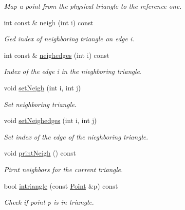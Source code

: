 \begin{DoxyCompactItemize}
\begin{DoxyCompactList}\small\item\em Map a point from the physical triangle to the reference one. \end{DoxyCompactList}\item 
int const \& \hyperlink{classTspeed_1_1Geo_1_1Triangle_a9258f1265a916d2ed4ccf4c0d0ddcbb7}{neigh} (int i) const 
\begin{DoxyCompactList}\small\item\em Ged index of neighboring triangle on edge i. \end{DoxyCompactList}\item 
int const \& \hyperlink{classTspeed_1_1Geo_1_1Triangle_a223bb2cb8fc96ea689daa5e7312aa7ca}{neighedges} (int i) const 
\begin{DoxyCompactList}\small\item\em Index of the edge i in the nieghboring triangle. \end{DoxyCompactList}\item 
void \hyperlink{classTspeed_1_1Geo_1_1Triangle_a1d71aed7672a87aed76934626d671ba7}{set\-Neigh} (int i, int j)
\begin{DoxyCompactList}\small\item\em Set neighboring triangle. \end{DoxyCompactList}\item 
void \hyperlink{classTspeed_1_1Geo_1_1Triangle_a8c174fbb7b71ef4625f021166bd1c8a6}{set\-Neighedges} (int i, int j)
\begin{DoxyCompactList}\small\item\em Set index of the edge of the nieghboring triangle. \end{DoxyCompactList}\item 
void \hyperlink{classTspeed_1_1Geo_1_1Triangle_a91d1f81ecb8f0524257ea821245d6c3f}{print\-Neigh} () const 
\begin{DoxyCompactList}\small\item\em Pirnt neighbors for the current triangle. \end{DoxyCompactList}\item 
bool \hyperlink{classTspeed_1_1Geo_1_1Triangle_af35a8855e804d92c28a922aaa5abf187}{intriangle} (const \hyperlink{classTspeed_1_1Geo_1_1Point}{Point} \&p) const 
\begin{DoxyCompactList}\small\item\em Check if point p is in triangle. \end{DoxyCompactList}\end{DoxyCompactItemize}
